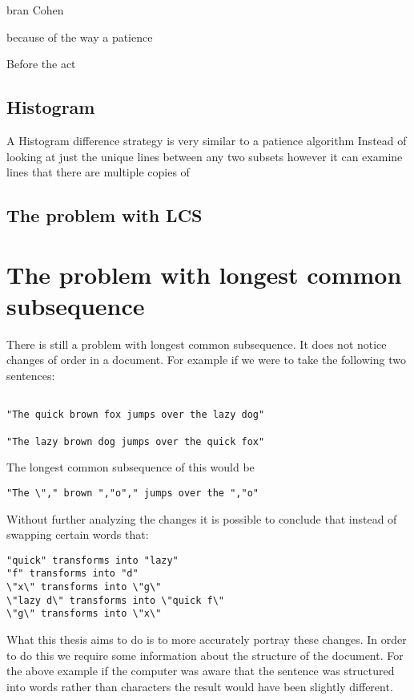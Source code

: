 bran Cohen

because of the way a patience 

Before the act

\subsection{Histogram}
A Histogram difference strategy is very similar to a patience algorithm
Instead of looking at just the unique lines between any two subsets however it can examine lines that there are multiple copies of 

\subsection{The problem with LCS}
\section{The problem with longest common subsequence}
There is still a problem with longest common subsequence. It does not notice changes of order in a document.  For example if we were to take the following two sentences:

\begin{verbatim}

"The quick brown fox jumps over the lazy dog"

"The lazy brown dog jumps over the quick fox"

\end{verbatim}

The longest common subsequence of this would be

\begin{verbatim}
"The \"," brown ","o"," jumps over the ","o"
\end{verbatim}

Without further analyzing the changes it is possible to conclude that instead of swapping certain words that:

\begin{verbatim}
"quick" transforms into "lazy"
"f" transforms into "d"
\"x\" transforms into \"g\"
\"lazy d\" transforms into \"quick f\"
\"g\" transforms into \"x\"
\end{verbatim}

What this thesis aims to do is to more accurately portray these changes.
In order to do this we require some information about the structure of the document.
For the above example if the computer was aware that the sentence was structured into words rather than characters the result would have been slightly different.

